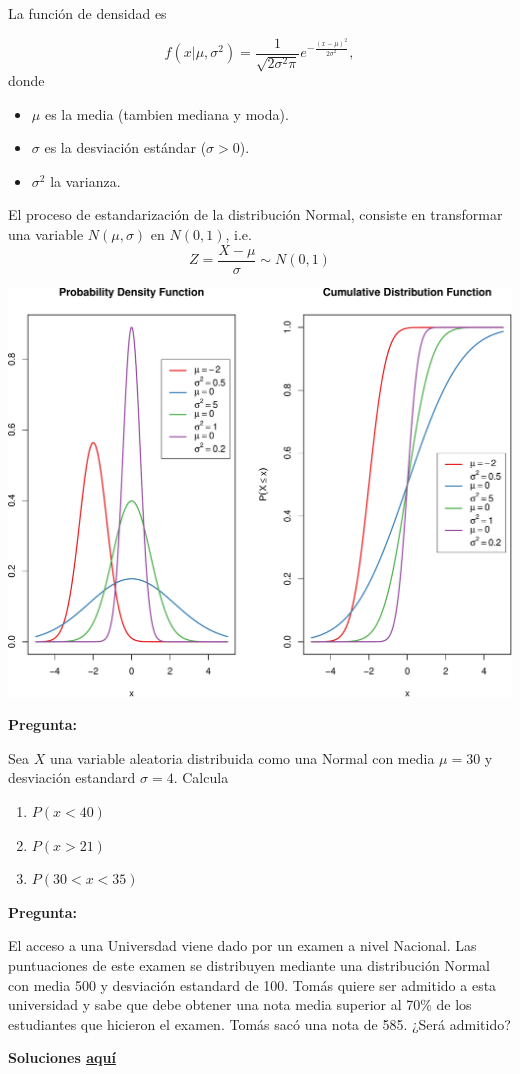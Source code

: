 \documentclass[]{article}
\def\tightlist{}
\numberwithin{equation}{section}
\begin{document}
La función de densidad es

\[
f(x | \mu,\sigma^2) = \frac{1}{\sqrt{2\sigma^2\pi}} e ^{-\frac{(x-\mu)^2}{2\sigma^2}},
\] donde

\begin{itemize}
\tightlist
\item
  \(\mu\) es la media (tambien mediana y moda).
\item
  \(\sigma\) es la desviación estándar (\(\sigma>0\)).
\item
  \(\sigma^2\) la varianza.
\end{itemize}

El proceso de estandarización de la distribución Normal, consiste en
transformar una variable \(N(\mu,\sigma)\) en \(N(0,1)\), i.e. \[
Z = \frac{X-\mu}{\sigma} \sim N(0,1)
\]

\includegraphics{tema4_files/figure-latex/unnamed-chunk-11-1.pdf}

\textbf{Pregunta:}

Sea \(X\) una variable aleatoria distribuida como una Normal con media
\(\mu = 30\) y desviación estandard \(\sigma = 4\). Calcula

\begin{enumerate}
\def\labelenumi{\alph{enumi})}
\item
  \(P(x<40)\)
\item
  \(P(x>21)\)
\item
  \(P(30<x<35)\)
\end{enumerate}

\textbf{Pregunta:}

El acceso a una Universdad viene dado por un examen a nivel Nacional.
Las puntuaciones de este examen se distribuyen mediante una distribución
Normal con media 500 y desviación estandard de 100. Tomás quiere ser
admitido a esta universidad y sabe que debe obtener una nota media
superior al 70\% de los estudiantes que hicieron el examen. Tomás sacó
una nota de 585. ¿Será admitido?

\textbf{Soluciones \href{IntroSM_sol.html}{aquí}}
\end{document}
